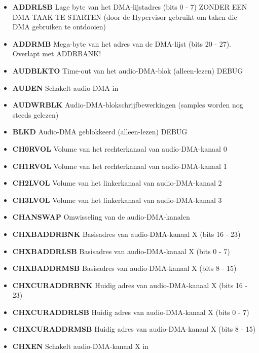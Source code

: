 \begin{itemize}
\item{\bf{ADDRLSB}} Lage byte van het DMA-lijstadres (bits 0 - 7) ZONDER EEN DMA-TAAK TE STARTEN (door de Hypervisor gebruikt om taken die DMA gebruiken te ontdooien)
\item{\bf{ADDRMB}} Mega-byte van het adres van de DMA-lijst (bits 20 - 27). Overlapt met ADDRBANK!
\item{\bf{AUDBLKTO}} Time-out van het audio-DMA-blok (alleen-lezen) DEBUG
\item{\bf{AUDEN}} Schakelt audio-DMA in
\item{\bf{AUDWRBLK}} Audio-DMA-blokschrijfbewerkingen (samples worden nog steeds gelezen)
\item{\bf{BLKD}} Audio-DMA geblokkeerd (alleen-lezen) DEBUG
\item{\bf{CH0RVOL}} Volume van het rechterkanaal van audio-DMA-kanaal 0
\item{\bf{CH1RVOL}} Volume van het rechterkanaal van audio-DMA-kanaal 1
\item{\bf{CH2LVOL}} Volume van het linkerkanaal van audio-DMA-kanaal 2
\item{\bf{CH3LVOL}} Volume van het linkerkanaal van audio-DMA-kanaal 3
\item{\bf{CHANSWAP}} Omwisseling van de audio-DMA-kanalen
\item{\bf{CHXBADDRBNK}} Basisadres van audio-DMA-kanaal X (bits 16 - 23)
\item{\bf{CHXBADDRLSB}} Basisadres van audio-DMA-kanaal X (bits 0 - 7)
\item{\bf{CHXBADDRMSB}} Basisadres van audio-DMA-kanaal X (bits 8 - 15)
\item{\bf{CHXCURADDRBNK}} Huidig adres van audio-DMA-kanaal X (bits 16 - 23)
\item{\bf{CHXCURADDRLSB}} Huidig adres van audio-DMA-kanaal X (bits 0 - 7)
\item{\bf{CHXCURADDRMSB}} Huidig adres van audio-DMA-kanaal X (bits 8 - 15)
\item{\bf{CHXEN}} Schakelt audio-DMA-kanaal X in

\end{itemize}
